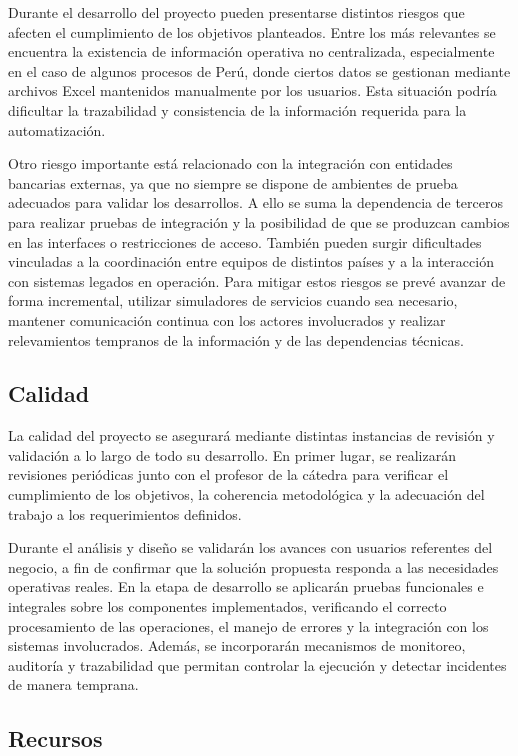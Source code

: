 Durante el desarrollo del proyecto pueden presentarse distintos riesgos que afecten el cumplimiento de los objetivos planteados. Entre los más relevantes se encuentra la existencia de información operativa no centralizada, especialmente en el caso de algunos procesos de Perú, donde ciertos datos se gestionan mediante archivos Excel mantenidos manualmente por los usuarios. Esta situación podría dificultar la trazabilidad y consistencia de la información requerida para la automatización.

Otro riesgo importante está relacionado con la integración con entidades bancarias externas, ya que no siempre se dispone de ambientes de prueba adecuados para validar los desarrollos. A ello se suma la dependencia de terceros para realizar pruebas de integración y la posibilidad de que se produzcan cambios en las interfaces o restricciones de acceso. También pueden surgir dificultades vinculadas a la coordinación entre equipos de distintos países y a la interacción con sistemas legados en operación. Para mitigar estos riesgos se prevé avanzar de forma incremental, utilizar simuladores de servicios cuando sea necesario, mantener comunicación continua con los actores involucrados y realizar relevamientos tempranos de la información y de las dependencias técnicas.

\subsection{Calidad}

La calidad del proyecto se asegurará mediante distintas instancias de revisión y validación a lo largo de todo su desarrollo. En primer lugar, se realizarán revisiones periódicas junto con el profesor de la cátedra para verificar el cumplimiento de los objetivos, la coherencia metodológica y la adecuación del trabajo a los requerimientos definidos.

Durante el análisis y diseño se validarán los avances con usuarios referentes del negocio, a fin de confirmar que la solución propuesta responda a las necesidades operativas reales. En la etapa de desarrollo se aplicarán pruebas funcionales e integrales sobre los componentes implementados, verificando el correcto procesamiento de las operaciones, el manejo de errores y la integración con los sistemas involucrados. Además, se incorporarán mecanismos de monitoreo, auditoría y trazabilidad que permitan controlar la ejecución y detectar incidentes de manera temprana.

\subsection{Recursos}

